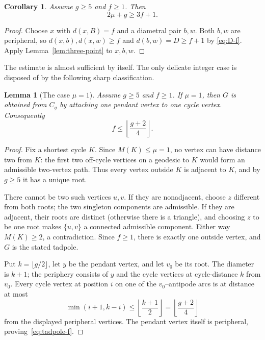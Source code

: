 \documentclass[11pt]{article}
\numberwithin{equation}{section}
\newtheorem{lemma}[theorem]{Lemma}
\newtheorem{corollary}[theorem]{Corollary}
\theoremstyle{remark}
\begin{document}
\begin{corollary}\label{cor:metric-mu}
Assume $g\ge5$ and $f\ge1$.  Then
\begin{equation}\label{eq:metric-mu}
  2\mu+g\ge3f+1.
\end{equation}
\end{corollary}

\begin{proof}
Choose $x$ with $d(x,B)=f$ and a diametral pair $b,w$.  Both $b,w$ are
peripheral, so $d(x,b),d(x,w)\ge f$ and $d(b,w)=D\ge f+1$ by
\eqref{eq:D-f}.  Apply Lemma~\ref{lem:three-point} to $x,b,w$.
\end{proof}

The estimate is almost sufficient by itself.  The only delicate integer
case is disposed of by the following sharp classification.

\begin{lemma}[The case $\mu=1$]\label{lem:mu-one}
Assume $g\ge5$ and $f\ge1$.  If $\mu=1$, then $G$ is obtained from $C_g$ by
attaching one pendant vertex to one cycle vertex.  Consequently
\begin{equation}\label{eq:tadpole-f}
  f\le\left\lfloor\frac{g+2}{4}\right\rfloor.
\end{equation}
\end{lemma}

\begin{proof}
Fix a shortest cycle $K$.  Since $M(K)\le\mu=1$, no vertex can have distance
two from $K$: the first two off-cycle vertices on a geodesic to $K$ would
form an admissible two-vertex path.  Thus every vertex outside $K$ is
adjacent to $K$, and by $g\ge5$ it has a unique root.

There cannot be two such vertices $u,v$.  If they are nonadjacent, choose
$z$ different from both roots; the two singleton components are admissible.
If they are adjacent, their roots are distinct (otherwise there is a
triangle), and choosing $z$ to be one root makes $\{u,v\}$ a connected
admissible component.  Either way $M(K)\ge2$, a contradiction.  Since
$f\ge1$, there is exactly one outside vertex, and $G$ is the stated tadpole.

Put $k=\lfloor g/2\rfloor$, let $y$ be the pendant vertex, and let $v_0$ be
its root.  The diameter is $k+1$; the periphery consists of $y$ and the cycle
vertices at cycle-distance $k$ from $v_0$.  Every cycle vertex at position
$i$ on one of the $v_0$--antipode arcs is at distance at most
\[
  \min(i+1,k-i)\le\left\lfloor\frac{k+1}{2}\right\rfloor
  =\left\lfloor\frac{g+2}{4}\right\rfloor
\]
from the displayed peripheral vertices.  The pendant vertex itself is
peripheral, proving~\eqref{eq:tadpole-f}.
\end{proof}
\end{document}
